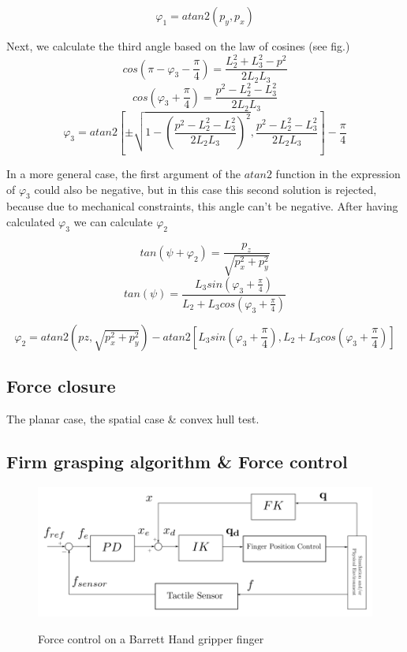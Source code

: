 \begin{equation}
φ_1 = atan2 \left( p_y, p_x \right)
\end{equation}

Next, we calculate the third angle based on the law of cosines (see fig.)
\[
cos \left( π - φ_3 - \frac{π}{4} \right) = \frac{L_2^2 + L_3^2 - p^2}{2 L_2 L_3}
\]
\[
cos \left(φ_3 + \frac{π}{4} \right) = \frac{p^2 - L_2^2 - L_3^2}{2 L_2 L_3}
\]
\begin{equation}
φ_3 = atan2 \left[ \pm \sqrt{1 - \left( \frac{p^2 - L_2^2 - L_3^2}{2 L_2 L_3} \right)^2} , \frac{p^2 - L_2^2 - L_3^2}{2 L_2 L_3} \right] - \frac{π}{4}
\end{equation}

In a more general case, the first argument of the $atan2$ function in the expression of $φ_3$ could also be negative,
but in this case this second solution is rejected, because due to mechanical constraints, this angle can't be negative. 
After having calculated $φ_3$ we can calculate $φ_2 $

\[
tan \left( ψ + φ_2 \right) = \frac{p_z}{\sqrt{p_x^2 + p_y^2}}
\]
\[
tan \left( ψ \right) = \frac{L_3 sin \left( φ_3 + \frac{π}{4} \right) }{L_2 + L_3 cos \left( φ_3 + \frac{π}{4} \right)}
\]

\begin{equation}
φ_2 = atan2 \left( pz, \sqrt{p_x^2 + p_y^2} \right) - atan2 \left[ L_3 sin \left( φ_3 + \frac{π}{4} \right), L_2 + L_3 cos \left( φ_3 + \frac{π}{4} \right) \right]
\end{equation}

\subsection{Force closure}
The planar case, the spatial case \& convex hull test.

\subsection{Firm grasping algorithm \& Force control}

\begin{center}
\begin{figure}[H]
\centering
\includegraphics[width=12cm]{images/finger-force-control.png}\\
\caption{Force control on a Barrett Hand gripper finger}
\end{figure}
\end{center}

